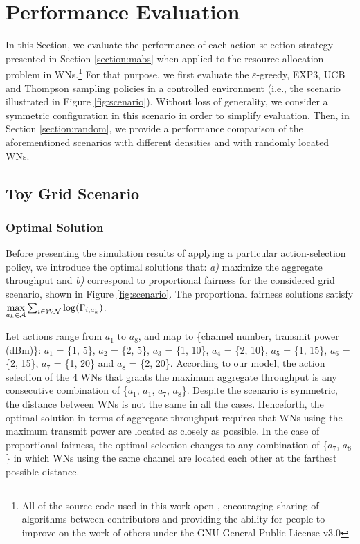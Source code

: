 \documentclass[10pt,journal,compsoc]{IEEEtran}
\begin{document}
	\section{Performance Evaluation}
	\label{section:performance_evaluation}	
	In this Section, we evaluate the performance of each action-selection strategy presented in Section \ref{section:mabs} when applied to the resource allocation problem in WNs.\footnote{All of the source code used in this work open \cite{fwilhelmi2017code}, encouraging sharing of algorithms between contributors and providing the ability for people to improve on the work of others under the GNU General Public License v3.0} For that purpose, we first evaluate the $\varepsilon$-greedy, EXP3, UCB and Thompson sampling policies in a controlled environment (i.e., the scenario illustrated in Figure \ref{fig:scenario}). Without loss of generality, we consider a symmetric configuration in this scenario in order to simplify evaluation. Then, in Section \ref{section:random}, we provide a performance comparison of the aforementioned scenarios with different densities and with randomly located WNs.	
	
	\subsection{Toy Grid Scenario}		
	\label{section:toy_grid_scenario}	
	
	\subsubsection{Optimal Solution}
	\label{section:optimal_solution}	
	Before presenting the simulation results of applying a particular action-selection policy, we introduce the optimal solutions that: \emph{a)} maximize the aggregate throughput and \emph{b)} correspond to proportional fairness for the considered grid scenario, shown in Figure \ref{fig:scenario}. The proportional fairness solutions satisfy $\underset{a_k \in \mathcal{A}}{\rm max} \sum_{i \in \mathcal{WN}} \log(\Gamma_{i,a_k})$. %
	
	Let actions range from $a_1$ to $a_8$, and map to \{channel number, transmit power (dBm)\}: $a_1$ = \{1, 5\}, $a_2$ = \{2, 5\}, $a_3$ = \{1, 10\}, $a_4$ = \{2, 10\}, $a_5$ = \{1, 15\}, $a_6$ = \{2, 15\}, $a_7$ = \{1, 20\} and $a_8$ = \{2, 20\}. According to our model, the action selection of the 4 WNs that grants the maximum aggregate throughput is any consecutive combination of \{$a_1$, $a_1$, $a_7$, $a_8$\}. 
	Despite the scenario is symmetric, the distance between WNs is not the same in all the cases. Henceforth, the optimal solution in terms of aggregate throughput requires that WNs using the maximum transmit power are located as closely as possible. In the case of proportional fairness, the optimal selection changes to any combination of \{$a_7$, $a_8$\} in which WNs using the same channel are located each other at the farthest possible distance.
\end{document}
